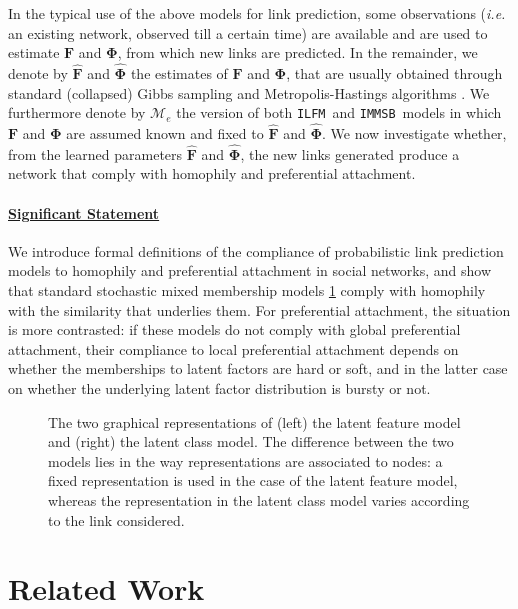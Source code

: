 \documentclass{llncs}
\newcommand*{\lpath}{./}%
\newcommand{\ifm}{\texttt{ILFM}}
\newcommand{\imb}{\texttt{IMMSB}}
\newcommand{\mat}[1]{\mathbf{#1}}
\begin{document}
In the typical use of the above models for link prediction, some observations (\textit{i.e.} an existing network, observed till a certain time) are available and are used to estimate $\mat{F}$ and $\mat{\Phi}$, from which new links are predicted. In the remainder, we denote by $\mat{\hat{F}}$ and $\mat{\hat{\Phi}}$ the estimates of $\mat{F}$ and $\mat{\Phi}$, that are usually obtained through standard (collapsed) Gibbs sampling and Metropolis-Hastings algorithms \cite{ILFRM,IBP,HDP,diMMSB}. We furthermore denote by $\mathcal{M}_e$ the version of both \ifm\ and \imb\ models in which $\mat{F}$ and $\mat{\Phi}$ are assumed known and fixed to $\mat{\hat{F}}$ and $\mat{\hat{\Phi}}$. We now investigate whether, from the learned parameters $\mat{\hat{F}}$ and $\mat{\hat{\Phi}}$, the new links generated produce a network that comply with homophily and preferential attachment.

\paragraph{\underline{Significant Statement}}We introduce formal definitions of the compliance of probabilistic link prediction models to homophily and preferential attachment in social networks, and show that standard stochastic mixed membership models \ref{fig:mmm} comply with homophily with the similarity that underlies them. For preferential attachment, the situation is more contrasted: if these models do not comply with global preferential attachment, their compliance to local preferential attachment depends on whether the memberships to latent factors are hard or soft, and in the latter case on whether the underlying latent factor distribution is bursty or not.

\begin{figure}[t]
	\centering
	\vspace{1cm}
	\scalebox{0.88}{
	}
	\endminipage
	\scalebox{0.88}{
		}
	\endminipage
	\caption{The two graphical representations of (left) the latent feature model and (right) the latent class model. The difference between the two models lies in the way representations are associated to nodes: a fixed representation is used in the case of the latent feature model, whereas the representation in the latent class model varies according to the link considered.}
	\label{fig:mmm}
\end{figure}


\section{Related Work}
\end{document}
